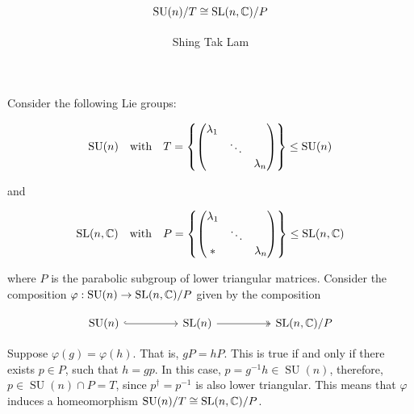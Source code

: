 \documentclass{article}
\title{\(\SU(n)/T \cong \SL(n, \C)/P\)}
\author{Shing Tak Lam}
\DeclareMathOperator{\SU}{SU}
\begin{document}
\maketitle

Consider the following Lie groups:

\[\SU(n) \qqtext{with} T = \left\{\begin{pmatrix}
    \lambda_1 \\ & \ddots \\ && \lambda_n
\end{pmatrix}\right\} \le \SU(n)\]

and

\[\SL(n, \C) \qqtext{with} P = \left\{\begin{pmatrix}
    \lambda_1 \\ & \ddots \\ * && \lambda_n
\end{pmatrix}\right\} \le \SL(n, \C)\]

where \(P\) is the parabolic subgroup of lower triangular matrices. Consider the composition \(\varphi : \SU(n) \to \SL(n, \C)/P\) given by the composition 

\[\begin{tikzcd}
	{\SU(n)} && {\SL(n)} && {\SL(n, \C)/P}
	\arrow[hook, from=1-1, to=1-3]
	\arrow[two heads, from=1-3, to=1-5]
\end{tikzcd}\]

Suppose \(\varphi(g) = \varphi(h)\). That is, \(gP = hP\). This is true if and only if there exists \(p \in P\), such that \(h = gp\). In this case, \(p = g^{-1}h \in \SU(n)\), therefore, \(p \in \SU(n) \cap P = T\), since \(p^\dagger = p^{-1}\) is also lower triangular. This means that \(\varphi\) induces a homeomorphism \(\SU(n)/T \cong \SL(n, \C)/P\).
\end{document}
